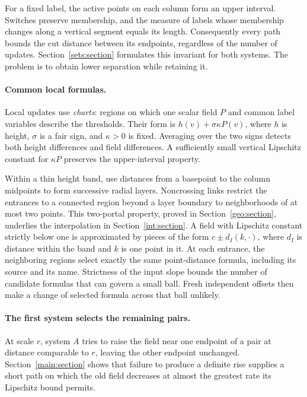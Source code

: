 For a fixed label, the active points on each column form an upper
interval. Switches preserve membership, and the measure of labels
whose membership changes along a vertical segment equals its length.
Consequently every path bounds the cut distance between its endpoints,
regardless of the number of updates. Section~\ref{sets:section}
formulates this invariant for both systems. The problem is to obtain
lower separation while retaining it.

\paragraph{Common local formulas.}
Local updates use \emph{charts}: regions on which one scalar field
$P$ and common label variables describe the thresholds. Their form is
$h(v)+\sigma\kappa P(v)$, where $h$ is height, $\sigma$ is a fair
sign, and $\kappa>0$ is fixed. Averaging over the two signs detects
both height differences and field differences. A sufficiently small
vertical Lipschitz constant for $\kappa P$ preserves the upper-interval
property.

Within a thin height band, use distances from a basepoint to the
column midpoints to form successive radial layers. Noncrossing links
restrict the entrances to a connected region beyond a layer boundary
to neighborhoods of at most two points. This two-portal property, proved in
Section~\ref{geo:section}, underlies the interpolation in
Section~\ref{int:section}. A field with Lipschitz constant strictly
below one is approximated by pieces of the form $c\pm d_I(k,\cdot)$,
where $d_I$ is distance within the band and $k$ is one point in it.
At each entrance, the neighboring regions select exactly the same
point-distance formula, including its source and its name.
Strictness of the input slope bounds
the number of candidate formulas that can govern a small ball.
Fresh independent offsets then make a change of selected
formula across that ball unlikely.

\paragraph{The first system selects the remaining pairs.}
At scale $r$, system $A$ tries to raise the field near one endpoint
of a pair at distance comparable to $r$, leaving the other endpoint
unchanged. Section~\ref{main:section} shows that failure to produce
a definite rise supplies a short path on which the old field
decreases at almost the greatest rate its Lipschitz bound permits.

